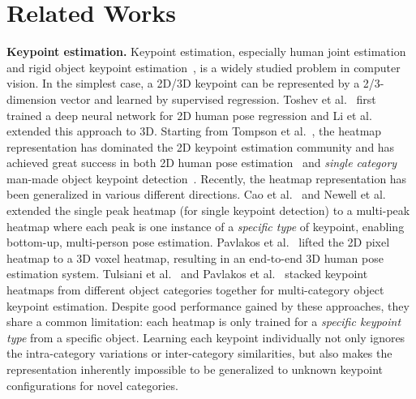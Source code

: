 \documentclass[runningheads]{llncs}
\begin{document}
  \section{Related Works}

\textbf{Keypoint estimation.}
Keypoint estimation, especially human joint estimation~\cite{toshev2014deeppose,tompson2015efficient,newell2016stacked,cao2017realtime,Zhou_2017_ICCV} and rigid object keypoint estimation~\cite{wu2016single,zhou2017unsupervised}, is a widely studied problem in computer vision.
In the simplest case, a 2D/3D keypoint can be represented by a 2/3-dimension vector and learned by supervised regression.
Toshev et al.~\cite{toshev2014deeppose} first trained a deep neural network for 2D human pose regression
and Li et al.~\cite{li20143d} extended this approach to 3D.
Starting from Tompson et al.~\cite{tompson2014joint}, the heatmap representation has dominated the 2D keypoint estimation community and has achieved great success in both 2D human pose estimation~\cite{newell2016stacked,wei2016convolutional,yang2017learning} and \emph{single category} man-made object keypoint detection~\cite{wu2016single,marrnet}.
Recently, the heatmap representation has been generalized in various different directions.
Cao et al.~\cite{cao2017realtime} and Newell et al.~\cite{newell2017associative} extended the single peak heatmap (for single keypoint detection) to a multi-peak heatmap where each peak is one instance of a \emph{specific type} of keypoint, enabling bottom-up, multi-person pose estimation.
Pavlakos et al.~\cite{pavlakos2017coarse} lifted the 2D pixel heatmap to a 3D voxel heatmap, resulting in an end-to-end 3D human pose estimation system.
Tulsiani et al.~\cite{tulsiani2015viewpoints} and Pavlakos et al.~\cite{pavlakos20176} stacked keypoint heatmaps from different object categories together for multi-category object keypoint estimation.
Despite good performance gained by these approaches, they share a common limitation:
each heatmap is only trained for a \emph{specific keypoint type} from a specific object.
Learning each keypoint individually not only ignores the intra-category variations or inter-category similarities, but also makes the representation inherently impossible to be generalized to unknown keypoint configurations for novel categories.
\end{document}
